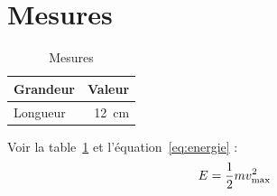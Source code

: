 \section{Mesures}\label{sec:mesures}
\begin{table}[h]
  \centering
  \begin{tabular}{lr}
    \toprule
    Grandeur & Valeur \\
    \midrule
    Longueur & \SI{12}{\centi\metre} \\
    \bottomrule
  \end{tabular}
  \caption{Mesures}\label{tab:mesures}
\end{table}
Voir la table~\ref{tab:mesures} et l'équation~\eqref{eq:energie} :
\begin{equation}\label{eq:energie}
  E = \frac{1}{2} m v_{\mathrm{max}}^2
\end{equation}
